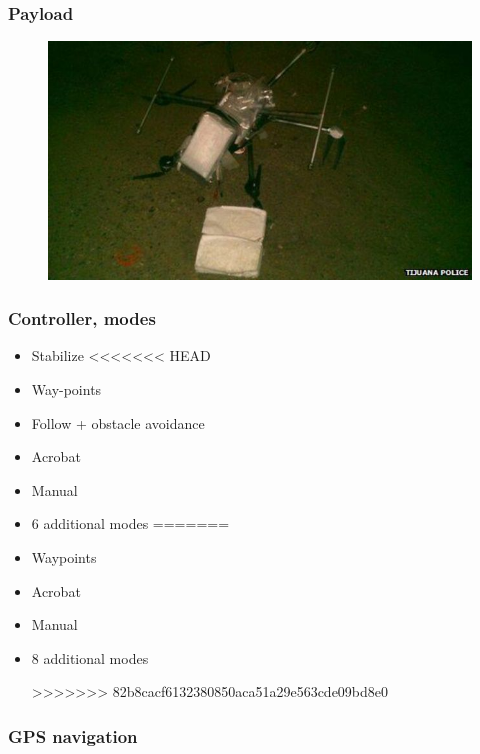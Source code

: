 \begin{frame}
\frametitle{Payload}

  \begin{figure}
  \includegraphics[scale=0.6]{pic/03_our-copter/drug.jpg}
  \end{figure}
  
\end{frame}

\begin{frame}
\frametitle{Controller, modes}

  \begin{itemize}
    \item Stabilize    
<<<<<<< HEAD
    \item Way-points   
	\item Follow + obstacle avoidance
	\item Acrobat 	
	\item Manual 	
	\item 6 additional modes 
=======
    \item Waypoints   
	\item Acrobat
	\item Manual 
	\item 8 additional modes 

>>>>>>> 82b8cacf6132380850aca51a29e563cde09bd8e0
  \end{itemize}
  
\end{frame}

\begin{frame}
\frametitle{GPS navigation}

  
\end{frame}

